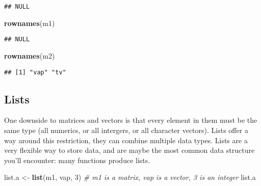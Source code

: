\documentclass[]{article}
\newenvironment{Shaded}{\begin{snugshade}}{\end{snugshade}}
\newcommand{\KeywordTok}[1]{\textcolor[rgb]{0.13,0.29,0.53}{\textbf{#1}}}
\newcommand{\DecValTok}[1]{\textcolor[rgb]{0.00,0.00,0.81}{#1}}
\newcommand{\StringTok}[1]{\textcolor[rgb]{0.31,0.60,0.02}{#1}}
\newcommand{\CommentTok}[1]{\textcolor[rgb]{0.56,0.35,0.01}{\textit{#1}}}
\newcommand{\NormalTok}[1]{#1}
\begin{document}
\begin{verbatim}
## NULL
\end{verbatim}

\begin{Shaded}
\begin{Highlighting}[]
\KeywordTok{rownames}\NormalTok{(m1)}
\end{Highlighting}
\end{Shaded}

\begin{verbatim}
## NULL
\end{verbatim}

\begin{Shaded}
\begin{Highlighting}[]
\KeywordTok{rownames}\NormalTok{(m2)}
\end{Highlighting}
\end{Shaded}

\begin{verbatim}
## [1] "vap" "tv"
\end{verbatim}

\subsection{Lists}\label{lists}

One downside to matrices and vectors is that every element in them must
be the same type (all numerics, or all intergers, or all character
vectors). Lists offer a way around this restriction, they can combine
multiple data types. Lists are a very flexible way to store data, and
are maybe the most common data structure you'll encounter: many
functions produce lists.

\begin{Shaded}
\begin{Highlighting}[]
\NormalTok{list.a <-}\StringTok{ }\KeywordTok{list}\NormalTok{(m1, vap, }\DecValTok{3}\NormalTok{) }\CommentTok{# m1 is a matrix, vap is a vector, 3 is an integer}
\NormalTok{list.a}
\end{Highlighting}
\end{Shaded}
\end{document}
